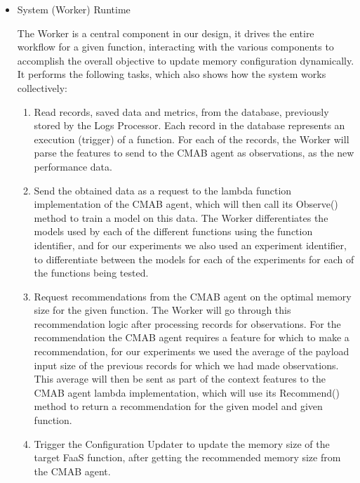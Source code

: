 \documentclass[conference]{IEEEtran}
\begin{document}
\begin{itemize}
\item System (Worker) Runtime

The Worker is a central component in our design, it drives the entire workflow for a given function, interacting with the various components to accomplish the overall objective to update memory configuration dynamically. It performs the following tasks, which also shows how the system works collectively:

\begin{enumerate}
    \item Read records, saved data and metrics, from the database, previously stored by the Logs Processor. Each record in the database represents an execution (trigger) of a function. For each of the records, the Worker will parse the features to send to the CMAB agent as observations, as the new performance data.
    \item Send the obtained data as a request to the lambda function implementation of the CMAB agent, which will then call its Observe() method to train a model on this data. The Worker differentiates the models used by each of the different functions using the function identifier, and for our experiments we also used an experiment identifier, to differentiate between the models for each of the experiments for each of the functions being tested.
    \item Request recommendations from the CMAB agent on the optimal memory size for the given function. The Worker will go through this recommendation logic after processing records for observations. For the recommendation the CMAB agent requires a feature for which to make a recommendation, for our experiments we used the average of the payload input size of the previous records for which we had made observations. This average will then be sent as part of the context features to the CMAB agent lambda implementation, which will use its Recommend() method to return a recommendation for the given model and given function.
    \item Trigger the Configuration Updater to update the memory size of the target FaaS function, after getting the recommended memory size from the CMAB agent.
\end{enumerate}

\end{itemize}
\end{document}
